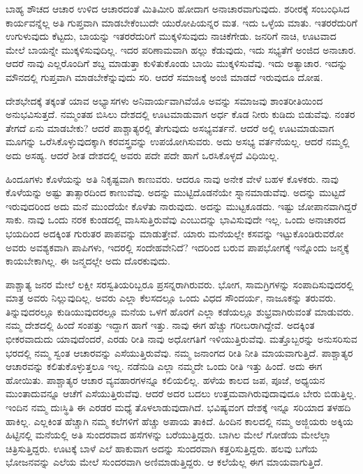 ಬಾಹ್ಯ ಶೌಚದ ಆಚಾರ ಉಳಿದ ಆಚಾರದಂತೆ ಮಿತಿಮೀರಿ ಹೋದಾಗ ಅನಾಚಾರ\break ವಾಗುವುದು. ಶರೀರಕ್ಕೆ ಸಂಬಂಧಿಸಿದ ಕಾರ್ಯವನ್ನೆಲ್ಲ ಅತಿ ಗುಪ್ತವಾಗಿ ಮಾಡಬೇಕೆಂಬುದೇ ಯುರೋಪಿಯನ್ನರ ಮತ. ಇದು ಒಳ್ಳೆಯ ಮಾತು. ಇತರರೆದುರಿಗೆ ಉಗುಳುವುದು ಕೆಟ್ಟದು, ಬಾಯನ್ನು ಇತರರೆದುರಿಗೆ ಮುಕ್ಕಳಿಸುವುದು ನಾಚಿಕೆಗೇಡು. ಜನರಿಗೆ ನಾಚಿ, ಊಟವಾದ ಮೇಲೆ ಬಾಯನ್ನೇ ಮುಕ್ಕಳಿಸುವುದಿಲ್ಲ. ಇದರ ಪರಿಣಾಮವಾಗಿ ಹಲ್ಲು ಕೆಡುವುದು, ಇದು ಸಭ್ಯತೆಗೆ ಅಂಜಿದ ಅನಾಚಾರ. ಆದರೆ ನಾವು ಎಲ್ಲರೊಂದಿಗೆ ಶಬ್ದ ಮಾಡುತ್ತಾ ಕುಳಿತುಕೊಂಡು ಬಾಯಿ ಮುಕ್ಕಳಿಸುವೆವು. ಇದು ಅತ್ಯಾಚಾರ. ಇದನ್ನು ಮೌನದಲ್ಲಿ ಗುಪ್ತವಾಗಿ ಮಾಡಬೇಕೆನ್ನುವುದು ಸರಿ. ಆದರೆ ಸಮಾಜಕ್ಕೆ ಅಂಜಿ ಮಾಡದೆ ಇರುವುದೂ ದೋಷ.

ದೇಶಭೇದಕ್ಕೆ ತಕ್ಕಂತೆ ಯಾವ ಅಭ್ಯಾಸಗಳು ಅನಿವಾರ್ಯವಾಗಿವೆಯೊ ಅವನ್ನು ಸಮಾಜವು ಶಾಂತರೀತಿಯಿಂದ ಅನುಭವಿಸುತ್ತದೆ. ನಮ್ಮಂತಹ ಬಿಸಿಲು ದೇಶದಲ್ಲಿ ಊಟ\break ಮಾಡುವಾಗ ಅರ್ಧ ಕೊಡ ನೀರು ಕುಡಿದು ಬಿಡುವೆವು. ನಂತರ ತೇಗದೆ ಏನು ಮಾಡಬೇಕು? ಆದರೆ ಪಾಶ್ಚಾತ್ಯರಲ್ಲಿ ತೇಗುವುದು ಅಸಭ್ಯವರ್ತನೆ. ಆದರೆ ಅಲ್ಲಿ ಊಟಮಾಡುವಾಗ ಮೂಗನ್ನು ಒರೆಸಿಕೊಳ್ಳುವುದಕ್ಕಾಗಿ ಕರವಸ್ತ್ರವನ್ನು ಉಪಯೋಗಿಸುವರು. ಅದು ಅಸಭ್ಯ ವರ್ತನೆಯಲ್ಲ. ಆದರೆ ನಮ್ಮಲ್ಲಿ ಅದು ಅಸಹ್ಯ. ಆದರೆ ಶೀತ ದೇಶದಲ್ಲಿ ಅವರು ಪದೇ ಪದೇ ಹಾಗೆ ಒರಸಿಕೊಳ್ಳದೆ ವಿಧಿಯಿಲ್ಲ.

ಹಿಂದೂಗಳು ಕೊಳೆಯನ್ನು ಅತಿ ನಿಕೃಷ್ಟವಾಗಿ ಕಾಣುವರು. ಆದರೂ ನಾವು ಅನೇಕ ವೇಳೆ ಬಹಳ ಕೊಳಕರು. ನಾವು ಕೊಳೆಯನ್ನು ಅಷ್ಟು ತಾತ್ಸಾರದಿಂದ ಕಾಣುವೆವು. ಅದನ್ನು ಮುಟ್ಟಿದೊಡನೆಯೇ ಸ್ನಾನಮಾಡುವೆವು. ಅದನ್ನು ಮುಟ್ಟದೆ ಇರುವುದರಿಂದ ಅದು ಮನೆ ಮುಂದೆಯೇ ಕೊಳೆತು ನಾರುವುದು. ಅದನ್ನು ಮುಟ್ಟಕೂಡದು. ಇಷ್ಟು ಜೋಪಾನವಾಗಿದ್ದರೆ ಸಾಕು. ನಾವು ಒಂದು ನರಕ ಕುಂಡದಲ್ಲಿ ವಾಸಿಸುತ್ತಿರುವೆವು ಎಂಬುದನ್ನು ಭಾವಿಸುವುದೇ ಇಲ್ಲ. ಒಂದು ಅನಾಚಾರದ ಭಯದಿಂದ ಅದಕ್ಕಿಂತ ಗುರುತರ ಪಾಪವನ್ನು ಮಾಡುತ್ತೇವೆ. ಯಾರು ಮನೆಯಲ್ಲೇ ಕಸವನ್ನು ಇಟ್ಟುಕೊಂಡಿರುವರೋ ಅವರು ಅವಶ್ಯಕವಾಗಿ ಪಾಪಿಗಳು, ಇದರಲ್ಲಿ ಸಂದೇಹವೇನಿದೆ? ಇದರಿಂದ ಬರುವ ಪಾಪಭೋಗಕ್ಕೆ ಇನ್ನೊಂದು ಜನ್ಮಕ್ಕೆ ಕಾಯಬೇಕಾಗಿಲ್ಲ. ಈ ಜನ್ಮದಲ್ಲೇ ಅದು ದೊರಕುವುದು.

ಪಾಶ್ಚಾತ್ಯ ಜನರ ಮೇಲೆ ಲಕ್ಷೀ ಸರಸ್ವತಿಯರಿಬ್ಬರೂ ಪ್ರಸನ್ನರಾಗಿರುವರು. ಭೋಗ, ಸಾಮಗ್ರಿಗಳನ್ನು ಸಂಪಾದಿಸುವುದರಲ್ಲಿ ಮಾತ್ರ ಅವರು ನಿಲ್ಲುವುದಿಲ್ಲ. ಅವರು ಎಲ್ಲಾ ಕೆಲಸದಲ್ಲೂ ಒಂದು ವಿಧದ ಸೌಂದರ್ಯ, ನಾಜೂಕನ್ನು ತರುವರು. ತಿನ್ನುವುದರಲ್ಲೂ ಕುಡಿಯುವುದರಲ್ಲೂ ಮನೆಯ ಒಳಗೆ ಹೊರಗೆ ಎಲ್ಲಾ ಕಡೆಯಲ್ಲೂ ಶುಭ್ರವಾಗಿರುವಂತೆ ಮಾಡುವರು. ನಮ್ಮ ದೇಶದಲ್ಲಿ ಹಿಂದೆ ಸಂಪತ್ತು ಇದ್ದಾಗ ಹಾಗೆ ಇತ್ತು. ನಾವು ಈಗ ಹೆಚ್ಚು ಗರೀಬರಾಗಿದ್ದೇವೆ. ಅದಕ್ಕಿಂತ ಭೀಕರವಾದುದು ಯಾವುದೆಂದರೆ, ಎರಡು ರೀತಿ ನಾವು ಅಧೋಗತಿಗೆ ಇಳಿಯುತ್ತಿರುವೆವು. ಮತ್ತೊಬ್ಬರನ್ನು ಅನುಸರಿಸುವ ಭರದಲ್ಲಿ ನಮ್ಮ ಸ್ವಂತ ಆಚಾರವನ್ನು ಎಸೆಯುತ್ತಿರುವೆವು. ನಮ್ಮ ಜನಾಂಗದ ರೀತಿ ನೀತಿ ಮಾಯವಾಗುತ್ತಿದೆ. ಪಾಶ್ಚಾತ್ಯರ ಆಚಾರವನ್ನು ಕಲಿತುಕೊಳ್ಳುತ್ತಲೂ ಇಲ್ಲ. ನಡೆನುಡಿ ಎಲ್ಲಾ ನಮ್ಮದೇ ಒಂದು ರೀತಿ ಇತ್ತು ಹಿಂದೆ. ಅದು ಈಗ ಹೋಯಿತು. ಪಾಶ್ಚಾತ್ಯರ ಆಚಾರ ವ್ಯವಹಾರಗಳನ್ನೂ ಕಲಿಯಲಿಲ್ಲ. ಹಳೆಯ ಕಾಲದ ಜಪ, ಪೂಜೆ, ಅಧ್ಯಯನ ಮುಂತಾದುವನ್ನೂ ಆಚೆಗೆ ಎಸೆಯುತ್ತಿರುವೆವು. ಆದರೆ ಅದರ ಬದಲು ಉತ್ತಮವಾಗಿರುವುದಾವುದೂ ಬೇರು ಬಿಡುತ್ತಿಲ್ಲ. ಇಂದಿನ ನಮ್ಮ ದುಃಸ್ಥಿತಿ ಈ ಎರಡರ ಮಧ್ಯೆ ತೊಳಲಾಡುವುದಾಗಿದೆ. ಭವಿಷ್ಯವಂಗ ದೇಶಕ್ಕೆ ಇನ್ನೂ ಸರಿಯಾದ ತಳಹದಿ ಹಾಕಿಲ್ಲ. ಎಲ್ಲಕಿಂತ ಹೆಚ್ಚಾಗಿ ನಮ್ಮ ಕಲೆಗಳಿಗೆ ಹೆಚ್ಚು ಅಪಾಯ ತಾಕಿದೆ. ಹಿಂದಿನ ಕಾಲದಲ್ಲಿ ನಮ್ಮ ಅಜ್ಜಿಯರು ಅಕ್ಕಿಯ ಹಿಟ್ಟಿನಲ್ಲಿ ಮನೆಯಲ್ಲಿ ಅತಿ ಸುಂದರವಾದ ಹಸೆಗಳನ್ನು ಬರೆಯುತ್ತಿದ್ದರು. ಬಾಗಿಲ ಮೇಲೆ ಗೋಡೆಯ ಮೇಲೆಲ್ಲಾ ಚಿತ್ರಿಸುತ್ತಿದ್ದರು. ಊಟಕ್ಕೆ ಬಾಳೆ ಎಲೆ ಹಾಕುವಾಗ ಅದನ್ನು ಸುಂದರವಾಗಿ ಕತ್ತರಿಸುತ್ತಿದ್ದರು. ಹಲವು ಬಗೆಯ ಭೋಜನವನ್ನು ಎಲೆಯ ಮೇಲೆ ಸುಂದರವಾಗಿ ಅಣಿಮಾಡುತ್ತಿದ್ದರು. ಆ ಕಲೆಯೆಲ್ಲ ಈಗ ಮಾಯವಾಗುತ್ತಿದೆ.

